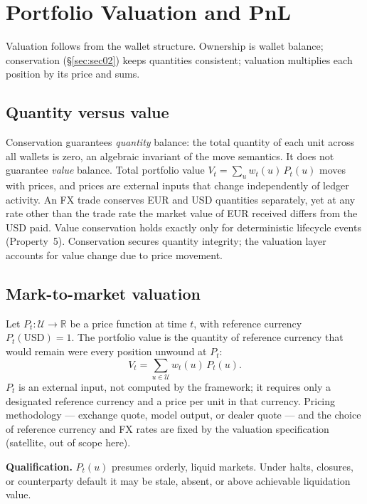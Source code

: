 \section{Portfolio Valuation and PnL}
\label{sec:sec05}\label{sec:valuation}

Valuation follows from the wallet structure. Ownership is wallet balance; conservation (\S\ref{sec:sec02}) keeps quantities consistent; valuation multiplies each position by its price and sums.

\subsection{Quantity versus value}

Conservation guarantees \emph{quantity} balance: the total quantity of each unit across all wallets is zero, an algebraic invariant of the move semantics. It does not guarantee \emph{value} balance. Total portfolio value $V_t = \sum_u w_t(u)\,P_t(u)$ moves with prices, and prices are external inputs that change independently of ledger activity. An FX trade conserves EUR and USD quantities separately, yet at any rate other than the trade rate the market value of EUR received differs from the USD paid. Value conservation holds exactly only for deterministic lifecycle events (Property~5). Conservation secures quantity integrity; the valuation layer accounts for value change due to price movement.

\subsection{Mark-to-market valuation}

\begin{definition}
\label{def:portfolio-value}
Let $P_t : \mathcal{U} \to \mathbb{R}$ be a price function at time $t$, with reference currency $P_t(\mathrm{USD}) = 1$. The portfolio value is the quantity of reference currency that would remain were every position unwound at $P_t$:
\[
V_t = \sum_{u \in \mathcal{U}} w_t(u)\,P_t(u).
\]
$P_t$ is an external input, not computed by the framework; it requires only a designated reference currency and a price per unit in that currency. Pricing methodology --- exchange quote, model output, or dealer quote --- and the choice of reference currency and FX rates are fixed by the valuation specification (satellite, out of scope here).
\end{definition}

\noindent\textbf{Qualification.} $P_t(u)$ presumes orderly, liquid markets. Under halts, closures, or counterparty default it may be stale, absent, or above achievable liquidation value.


